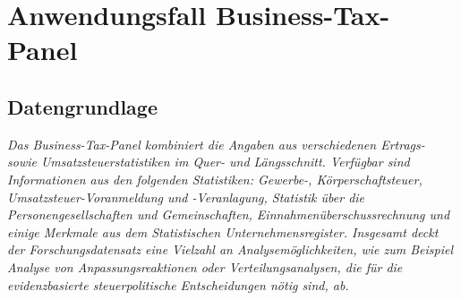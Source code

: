 \documentclass[
  german,
  10pt,
  twoside]{article}
\makeatletter
\newcommand{\berlintime}{%
  \berlinhr=\time\relax
  \divide\berlinhr by 60\relax
  \berlinmin=\time\relax
  \multiply\berlinhr by -60\relax
  \advance\berlinmin by \berlinhr\relax
  \berlinhr=\time\relax
  \divide\berlinhr by 60\relax
  \advance\berlinhr by 1\relax
  \ifnum\berlinhr>23\relax
    \advance\berlinhr by -24\relax
  \fi
  \ifnum\berlinhr<10 0\fi\the\berlinhr:\ifnum\berlinmin<10 0\fi\the\berlinmin%
}
\newif\ifdraftmode
\providecommand{\totalchars}{0}
\providecommand{\totalwords}{0}
\providecommand{\abstractchars}{0}
\providecommand{\abstractwords}{0}
\providecommand{\zusammenfassungchars}{0}
\providecommand{\zusammenfassungwords}{0}
\providecommand{\footnotecountnum}{0}
\providecommand{\citationcountnum}{0}
\newcommand{\doctitle}{$title$}
\newcommand{\docauthors}{$author-short$}
\newcommand{\docpublication}{$publication$}
\newcommand{\docpublicationissue}{$publication-issue$}
\newcommand{\metadatapage}{%
  \clearpage
  \thispagestyle{empty}
  \onecolumn
  \vspace*{1.5cm}
  
  {\raggedright
  {\LARGE\bfseries\color{wistaBlue} Dokument-Metadaten}\\[0.5cm]
  
  \begin{tabular}{@{}ll}
    \textbf{Titel:} & \doctitle \\[0.3em]
    \textbf{Autoren:} & \docauthors \\[0.3em]
    \textbf{Veröffentlichung:} & \docpublication\ \docpublicationissue \\[0.3em]
    \textbf{Erstellungsdatum:} & \today\ um \berlintime\ Uhr \\[0.3em]
  \end{tabular}
  
  \vspace{0.5cm}
  {\color{wistaBlue}\rule{\textwidth}{1pt}}
  \par}
  
  \vspace{1cm}
  
  {\large\bfseries\color{wistaDarkGray} Dokumentstatistik}\\[0.5cm]
  
  \small
  \begin{tabular}{@{}lrrrrrr@{}}
    \toprule
    \textbf{Abschnitt} & \textbf{Wörter} & \textbf{Zeichen} & \textbf{Fußn.} & \textbf{Quellen} & \textbf{Vorgabe} \\
    \midrule
    Insgesamt & \textcolor{wistaBlue}{\textbf{\totalwords}} & \textcolor{wistaBlue}{\textbf{\totalchars}} & \textcolor{wistaBlue}{\textbf{\footnotecountnum}} & \textcolor{wistaBlue}{\textbf{\citationcountnum}} & 30\,000 Z. \\
    Zusammenfassung & \textcolor{wistaBlue}{\textbf{\zusammenfassungwords}} & \textcolor{wistaBlue}{\textbf{\zusammenfassungchars}} & --- & --- & 800 Z. \\
    Abstract & \textcolor{wistaBlue}{\textbf{\abstractwords}} & \textcolor{wistaBlue}{\textbf{\abstractchars}} & --- & --- & 700 Z. \\
    \midrule
    \sectionrows
    \bottomrule
  \end{tabular}
  \normalsize
  
  \vspace{0.5cm}
  
  {\large\bfseries\color{wistaDarkGray} Schlüsselwörter}\\[0.3cm]
  \small
  \schlusselworterlist
  \normalsize
  
  \vspace{0.5cm}
  
  {\large\bfseries\color{wistaDarkGray} Keywords}\\[0.3cm]
  \small
  \keywordslist
  \normalsize
  
  \vspace{1cm}
  
  {\large\bfseries\color{wistaDarkGray} Tabellen}\\[0.3cm]
  
  \small
  \begin{tabular}{@{}lp{12cm}@{}}
    \toprule
    \textbf{Nr.} & \textbf{Beschreibung} \\
    \midrule
    \tablerows
    \bottomrule
  \end{tabular}
  \normalsize
  
  \vspace{1cm}
  
  {\large\bfseries\color{wistaDarkGray} Abbildungen}\\[0.3cm]
  
  \small
  \begin{tabular}{@{}lp{12cm}@{}}
    \toprule
    \textbf{Nr.} & \textbf{Beschreibung} \\
    \midrule
    \figurerows
    \bottomrule
  \end{tabular}
  \normalsize
  
  \clearpage
}
\makeatother
\begin{document}
\newcommand{\tablerows}{            \hyperref[tbl-pkg-versions]{Tabelle~1} & Versionen verfügbarer R-Packages \\
            \hyperref[tbl-baseline]{Tabelle~2} & Baselines in SAS und Stata (anhand 1\% des simuliertes BTP) \\
            \hyperref[tbl-benchmark-small]{Tabelle~3} & Performanz Messungen für die Fallzahlberechnung anhand 1\% des BTP \\
            \hyperref[tbl-benchmark-regr-small]{Tabelle~4} & Performanz Messungen für die Regressionsberechnung anhand 1\% des BTP \\
            \hyperref[tbl-benchmark]{Tabelle~5} & Performanz Messungen für die Fallzahlberechnung anhand 10\% des BTP \\
            \hyperref[tbl-benchmark-regr]{Tabelle~6} & Performanz Messungen für die Regressionsberechnung anhand 10\% des BTP \\
            \hyperref[tbl-bm-cnt-small]{Tabelle~7} & Benchmarkergebnisse für Fallzahlen (kleine Stichproben des BTP) \\
            \hyperref[tbl-bm-reg-small]{Tabelle~8} & Benchmarkergebnisse für Regression (kleine Stichproben des BTP) \\
}
\newcommand{\figurerows}{            \hyperref[fig-optimization-strategies]{Abbildung~1} & Strategien zur Performanz-Optimierung im FDZ-Bund \\
}
\newcommand{\schlusselworterlist}{}
\newcommand{\keywordslist}{}
\ifdraftmode
\metadatapage
\fi

\section{Anwendungsfall
Business-Tax-Panel}\label{anwendungsfall-business-tax-panel}

\subsection{Datengrundlage}\label{datengrundlage}

\emph{Das Business-Tax-Panel kombiniert die Angaben aus verschiedenen
Ertrags- sowie Umsatzsteuerstatistiken im Quer- und Längsschnitt.
Verfügbar sind Informationen aus den folgenden Statistiken: Gewerbe-,
Körperschaftsteuer, Umsatzsteuer-Voranmeldung und -Veranlagung,
Statistik über die Personengesellschaften und Gemeinschaften,
Einnahmenüberschussrechnung und einige Merkmale aus dem Statistischen
Unternehmensregister. Insgesamt deckt der Forschungsdatensatz eine
Vielzahl an Analysemöglichkeiten, wie zum Beispiel Analyse von
Anpassungsreaktionen oder Verteilungsanalysen, die für die
evidenzbasierte steuerpolitische Entscheidungen nötig sind, ab.}
\end{document}

